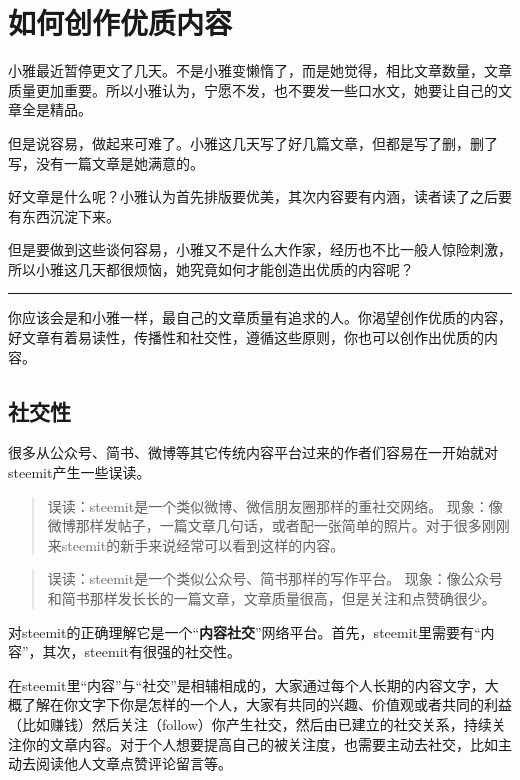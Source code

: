 \documentclass[]{ctexbook}
\begin{document}
\hypertarget{rhczyznr}{%
\section{如何创作优质内容}\label{rhczyznr}}

小雅最近暂停更文了几天。不是小雅变懒惰了，而是她觉得，相比文章数量，文章质量更加重要。所以小雅认为，宁愿不发，也不要发一些口水文，她要让自己的文章全是精品。

但是说容易，做起来可难了。小雅这几天写了好几篇文章，但都是写了删，删了写，没有一篇文章是她满意的。

好文章是什么呢？小雅认为首先排版要优美，其次内容要有内涵，读者读了之后要有东西沉淀下来。

但是要做到这些谈何容易，小雅又不是什么大作家，经历也不比一般人惊险刺激，所以小雅这几天都很烦恼，她究竟如何才能创造出优质的内容呢？

\begin{center}\rule{0.5\linewidth}{\linethickness}\end{center}

你应该会是和小雅一样，最自己的文章质量有追求的人。你渴望创作优质的内容，好文章有着易读性，传播性和社交性，遵循这些原则，你也可以创作出优质的内容。

\subsection{社交性}

很多从公众号、简书、微博等其它传统内容平台过来的作者们容易在一开始就对steemit产生一些误读。

\begin{quote}
误读：steemit是一个类似微博、微信朋友圈那样的重社交网络。
现象：像微博那样发帖子，一篇文章几句话，或者配一张简单的照片。对于很多刚刚来steemit的新手来说经常可以看到这样的内容。
\end{quote}

\begin{quote}
误读：steemit是一个类似公众号、简书那样的写作平台。
现象：像公众号和简书那样发长长的一篇文章，文章质量很高，但是关注和点赞确很少。
\end{quote}

对steemit的正确理解它是一个``\textbf{内容社交}''网络平台。首先，steemit里需要有``内容''，其次，steemit有很强的社交性。

在steemit里``内容''与``社交''是相辅相成的，大家通过每个人长期的内容文字，大概了解在你文字下你是怎样的一个人，大家有共同的兴趣、价值观或者共同的利益（比如赚钱）然后关注（follow）你产生社交，然后由已建立的社交关系，持续关注你的文章内容。对于个人想要提高自己的被关注度，也需要主动去社交，比如主动去阅读他人文章点赞评论留言等。
\end{document}

